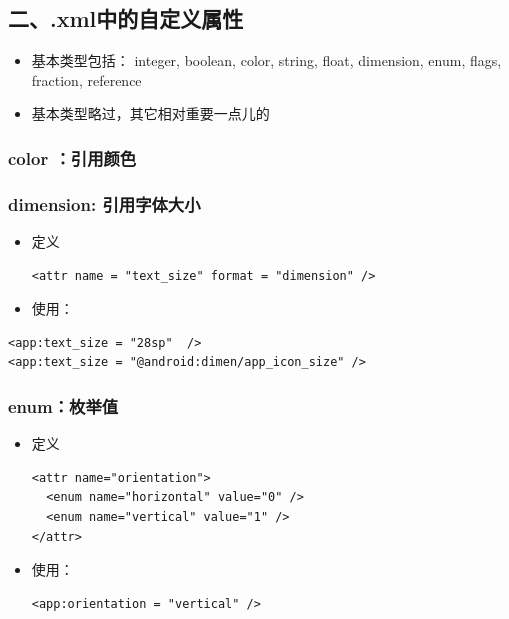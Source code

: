 \documentclass[9pt, b5paper]{article}
\begin{document}
\subsection{二、.xml中的自定义属性}
\label{sec-1-5}
\begin{itemize}
\item 基本类型包括： integer, boolean, color, string, float, dimension, enum, flags, fraction, reference
\item 基本类型略过，其它相对重要一点儿的
\end{itemize}
\subsubsection{color ：引用颜色}
\label{sec-1-5-1}
\subsubsection{dimension: 引用字体大小}
\label{sec-1-5-2}
\begin{itemize}
\item 定义
\begin{verbatim}
<attr name = "text_size" format = "dimension" />
\end{verbatim}
\item 使用：
\end{itemize}
\begin{verbatim}
<app:text_size = "28sp"  />
<app:text_size = "@android:dimen/app_icon_size" />
\end{verbatim}
\subsubsection{enum：枚举值}
\label{sec-1-5-3}
\begin{itemize}
\item 定义
\begin{verbatim}
<attr name="orientation">
  <enum name="horizontal" value="0" />
  <enum name="vertical" value="1" />
</attr>
\end{verbatim}
\item 使用：
\begin{verbatim}
<app:orientation = "vertical" />
\end{verbatim}
\end{itemize}
\end{document}
